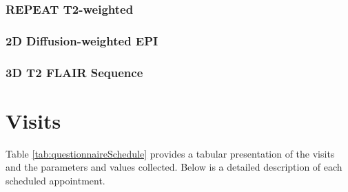 \subsubsection{REPEAT T2-weighted}

\subsubsection{2D Diffusion-weighted EPI}

\subsubsection{3D T2 \ac{FLAIR} Sequence}

\section{Visits}
Table \ref{tab:questionnaireSchedule} provides a tabular presentation of the visits and the parameters and values collected. Below is a detailed description of each scheduled appointment.


